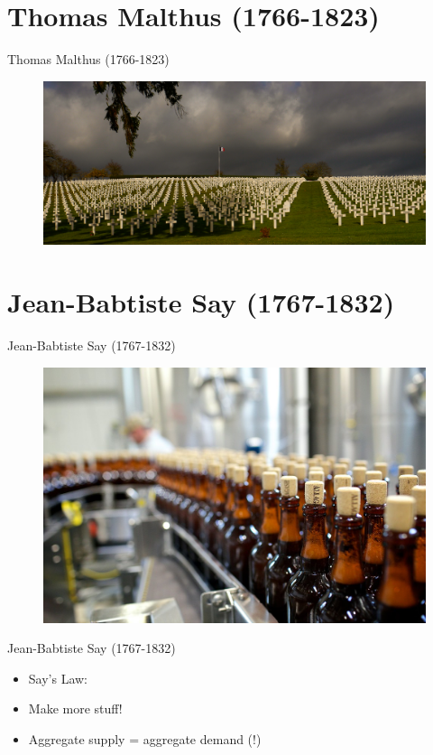 \documentclass{beamer}
\begin{document}
\section{Thomas Malthus (1766-1823)}
\begin{frame}{Thomas Malthus (1766-1823)}
      \begin{figure}
        \includegraphics[width=\textwidth, keepaspectratio]{../img/malthus.jpg}
    \end{figure}  
\end{frame}{}

\section{Jean-Babtiste Say (1767-1832)}

\begin{frame}{Jean-Babtiste Say (1767-1832)}
\begin{figure}[htpb]
	\centering
	\includegraphics[width=1\linewidth]{../img/beer.jpg}
\end{figure}
\end{frame}

\begin{frame}{Jean-Babtiste Say (1767-1832)}
    \begin{itemize}[<+- | alert@+>]
    \item Say's Law:
    \item Make more stuff!
    \item Aggregate supply = aggregate demand (!)
    \end{itemize}    
\end{frame}{}
\end{document}

